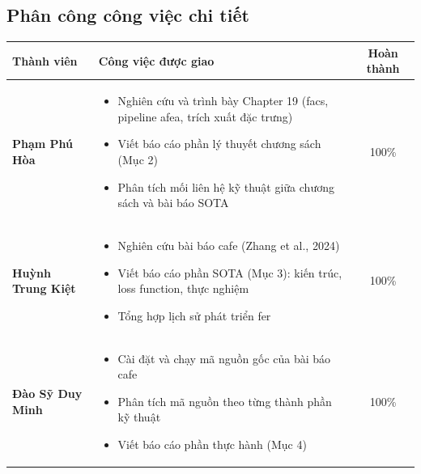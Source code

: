 \documentclass[12pt,a4paper]{article}
\let\oldtextbf\textbf
\renewcommand{\textbf}[1]{\oldtextbf{\textcolor{hcmublue}{#1}}}
\begin{document}
\subsection{Phân công công việc chi tiết}

\begin{table}[H]
\centering
\small
\begin{tabularx}{\textwidth}{|l|X|c|}
\hline
\textbf{Thành viên} & \textbf{Công việc được giao} & \textbf{Hoàn thành} \\ \hline

\textbf{Phạm Phú Hòa} &
\begin{minipage}[t]{\linewidth}
\begin{itemize}[leftmargin=*,nosep,after=\strut]
    \item[-] Nghiên cứu và trình bày Chapter 19 (\gls{facs}, pipeline \gls{afea}, trích xuất đặc trưng)
    \item[-] Viết báo cáo phần lý thuyết chương sách (Mục 2)
    \item[-] Phân tích mối liên hệ kỹ thuật giữa chương sách và bài báo SOTA
\end{itemize}
\end{minipage} & 100\% \\ \hline

\textbf{Huỳnh Trung Kiệt} &
\begin{minipage}[t]{\linewidth}
\begin{itemize}[leftmargin=*,nosep,after=\strut]
    \item[-] Nghiên cứu bài báo \gls{cafe} (Zhang et al., 2024)
    \item[-] Viết báo cáo phần SOTA (Mục 3): kiến trúc, loss function, thực nghiệm
    \item[-] Tổng hợp lịch sử phát triển \gls{fer}
\end{itemize}
\end{minipage} & 100\% \\ \hline

\textbf{Đào Sỹ Duy Minh} &
\begin{minipage}[t]{\linewidth}
\begin{itemize}[leftmargin=*,nosep,after=\strut]
    \item[-] Cài đặt và chạy mã nguồn gốc của bài báo \gls{cafe}
    \item[-] Phân tích mã nguồn theo từng thành phần kỹ thuật
    \item[-] Viết báo cáo phần thực hành (Mục 4)
\end{itemize}
\end{minipage} & 100\% \\ \hline


\end{tabularx}
\end{table}
\end{document}
